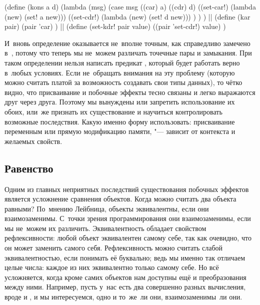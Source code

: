 \begin{code:lisp}
(define (kons a d)
  (lambda (msg)
    (case msg
      ((car) a)
      ((cdr) d)
      ((set-car!) (lambda (new) (set! a new)))
      ((set-cdr!) (lambda (new) (set! d new))) ) ) )
||
(define (kar pair)
  (pair 'car) )
||
(define (set-kdr! pair value)
  ((pair 'set-cdr!) value) )
\end{code:lisp}


И~вновь определение оказывается не~вполне точным, как справедливо замечено
в~\cite{fel90}, потому что теперь мы не~можем различать точечные пары и
замыкания. При таком определении нельзя написать предикат , который
будет работать верно в~любых условиях. Если не~обращать внимания на эту проблему
(которую можно считать платой за возможность создавать свои типы данных), то
чётко видно, что присваивание и побочные эффекты тесно связаны и легко
выражаются друг через друга. Поэтому мы вынуждены или запретить использование
их обоих, или~же признать их существование и научиться контролировать возможные
последствия. Какую именно форму использовать: присваивание переменным или прямую
модификацию памяти, "--- зависит от контекста и желаемых свойств.


\subsection{Равенство}\label{assignment/side-effects/ssect:equality}

Одним из главных неприятных последствий существования побочных эффектов является
усложнение сравнения объектов. Когда можно считать два объекта равными?
По~мнению Лейбница, объекты эквивалентны, если они взаимозаменимы. С~точки
зрения программирования они взаимозаменимы, если мы не~можем их различить.
Эквивалентность обладает свойством рефлексивности: любой объект эквивалентен
самому себе, так как очевидно, что он может заменить самого себя. Рефлексивность
можно считать слабой эквивалентностью, если понимать её буквально; ведь мы
именно так отличаем целые числа: каждое из них эквивалентно только самому себе.
Но всё усложняется, когда кроме самих объектов нам доступны ещё и преобразования
между ними. Например, пусть у~нас есть два совершенно разных вычисления, вроде
 и , и мы интересуемся, одно и то~же~ли они,
взаимозаменимы~ли они.

